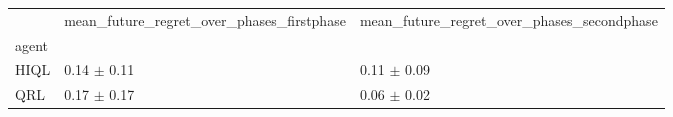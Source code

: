 \begin{tabular}{lll}
\toprule
 & mean_future_regret_over_phases_firstphase & mean_future_regret_over_phases_secondphase \\
agent &  &  \\
\midrule
HIQL & 0.14 $\pm$ 0.11 & 0.11 $\pm$ 0.09 \\
QRL & 0.17 $\pm$ 0.17 & 0.06 $\pm$ 0.02 \\
\bottomrule
\end{tabular}
